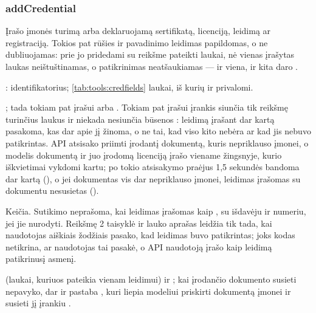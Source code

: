 \subsubsection{addCredential}\label{sec:tools:addCredential}
\begin{description}[style=multiline, leftmargin=19mm, labelwidth=17mm, labelsep=2mm,
  font=\sffamily\bfseries\footnotesize\color{ink}, itemsep=1pt, topsep=2pt, before=\raggedright]
  \item[Paskirtis] Įrašo įmonės turimą arba deklaruojamą sertifikatą, licenciją, leidimą ar
    registraciją. Tokios pat rūšies ir pavadinimo leidimas papildomas, o ne
    dubliuojamas: prie jo pridedami su reikšme pateikti laukai, nė vienas įrašytas laukas
    neištuštinamas, o patikrinimas neatšaukiamas --- ir viena, ir kita daro
    .
  \item[Įvestis] : identifikatorius; \cref{tab:tools:credfields} laukai, iš
    kurių  ir  privalomi.
  \item[Užklausos] ; tada
     tokiam pat įrašui arba
    . Tokiam pat įrašui įrankis siunčia tik
    reikšmę turinčius laukus ir niekada nesiunčia būsenos : leidimą įrašant dar
    kartą pasakoma, kas dar apie jį žinoma, o ne tai, kad viso kito nebėra ar kad jis nebuvo
    patikrintas. API atsisako priimti įrodantį dokumentą, kuris nepriklauso įmonei, o modelis
    dokumentą ir juo įrodomą licenciją įrašo viename žingsnyje, kurio iškvietimai vykdomi
    kartu; po tokio atsisakymo praėjus 1,5 sekundės bandoma dar kartą
    (), o jei dokumentas vis dar nepriklauso įmonei, leidimas įrašomas
    su dokumentu nesusietas ().
  \item[Pobūdis] Keičia. Sutikimo neprašoma, kai leidimas įrašomas kaip , su
    išdavėju ir numeriu, jei jie nurodyti. Reikšmę  2 taisyklė ir lauko
     aprašas leidžia tik tada, kai naudotojas aiškiais žodžiais pasako, kad
    leidimas buvo patikrintas; joks kodas netikrina, ar naudotojas tai pasakė, o API naudotoją
    įrašo kaip leidimą patikrinusį asmenį.
  \item[Grąžina]  (laukai, kuriuos  pateikia vienam leidimui)
    ir ; kai įrodančio dokumento susieti nepavyko, dar ir pastaba
    , kuri liepia modeliui priskirti dokumentą įmonei ir susieti jį įrankiu
    .
\end{description}

